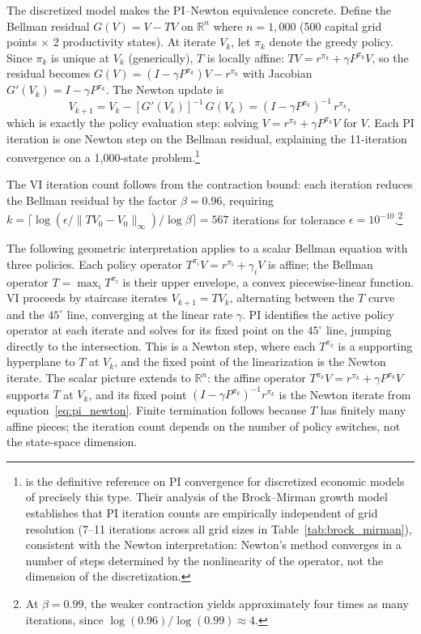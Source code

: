 The discretized model makes the PI--Newton equivalence concrete. Define the Bellman residual $G(V) = V - TV$ on $\mathbb{R}^n$ where $n = 1{,}000$ (500 capital grid points $\times$ 2 productivity states). At iterate $V_k$, let $\pi_k$ denote the greedy policy. Since $\pi_k$ is unique at $V_k$ (generically), $T$ is locally affine: $TV = r^{\pi_k} + \gamma P^{\pi_k} V$, so the residual becomes $G(V) = (I - \gamma P^{\pi_k})V - r^{\pi_k}$ with Jacobian $G'(V_k) = I - \gamma P^{\pi_k}$. The Newton update is
\begin{equation}
V_{k+1} = V_k - [G'(V_k)]^{-1}\, G(V_k) = (I - \gamma P^{\pi_k})^{-1}\, r^{\pi_k},
\label{eq:pi_newton}
\end{equation}
which is exactly the policy evaluation step: solving $V = r^{\pi_k} + \gamma P^{\pi_k} V$ for $V$. Each PI iteration is one Newton step on the Bellman residual, explaining the 11-iteration convergence on a 1,000-state problem.\footnote{\citet{santos2004} is the definitive reference on PI convergence for discretized economic models of precisely this type. Their analysis of the Brock--Mirman growth model establishes that PI iteration counts are empirically independent of grid resolution (7--11 iterations across all grid sizes in Table~\ref{tab:brock_mirman}), consistent with the Newton interpretation: Newton's method converges in a number of steps determined by the nonlinearity of the operator, not the dimension of the discretization.}

The VI iteration count follows from the contraction bound: each iteration reduces the Bellman residual by the factor $\beta = 0.96$, requiring $k = \lceil \log(\epsilon / \|TV_0 - V_0\|_\infty) / \log \beta \rceil = 567$ iterations for tolerance $\epsilon = 10^{-10}$.\footnote{At $\beta = 0.99$, the weaker contraction yields approximately four times as many iterations, since $\log(0.96)/\log(0.99) \approx 4$.}

The following geometric interpretation applies to a scalar Bellman equation with three policies. Each policy operator $T^{\pi_i} V = r^{\pi_i} + \gamma_i V$ is affine; the Bellman operator $T = \max_i T^{\pi_i}$ is their upper envelope, a convex piecewise-linear function. VI proceeds by staircase iterates $V_{k+1} = TV_k$, alternating between the $T$ curve and the $45^\circ$ line, converging at the linear rate $\gamma$. PI identifies the active policy operator at each iterate and solves for its fixed point on the $45^\circ$ line, jumping directly to the intersection. This is a Newton step, where each $T^{\pi_k}$ is a supporting hyperplane to $T$ at $V_k$, and the fixed point of the linearization is the Newton iterate. The scalar picture extends to $\mathbb{R}^n$: the affine operator $T^{\pi_k} V = r^{\pi_k} + \gamma P^{\pi_k} V$ supports $T$ at $V_k$, and its fixed point $(I - \gamma P^{\pi_k})^{-1} r^{\pi_k}$ is the Newton iterate from equation~\eqref{eq:pi_newton}. Finite termination follows because $T$ has finitely many affine pieces; the iteration count depends on the number of policy switches, not the state-space dimension.

